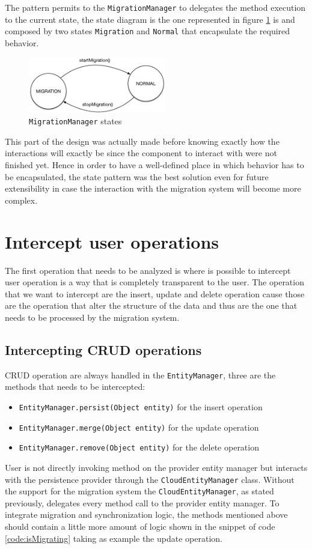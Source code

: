 \noindent The pattern permits to the \texttt{MigrationManager} to delegates the method execution to the current state, the state diagram is the one represented in figure \ref{fig:migration-fsa} is and composed by two states \texttt{Migration} and \texttt{Normal} that encapsulate the required behavior.
    
\begin{figure}[tbh]
  \centering
  \includegraphics[width=6cm]{images/migration_fsa}
  \caption{\texttt{MigrationManager} states}
  \label{fig:migration-fsa}
\end{figure} 

\noindent This part of the design was actually made before knowing exactly how the interactions will exactly be since the component to interact with were not finished yet. Hence in order to have a well-defined place in which behavior has to be encapsulated, the state pattern was the best solution even for future extensibility in case the interaction with the migration system will become more complex.  

\section{Intercept user operations}
The first operation that needs to be analyzed is where is possible to intercept user operation is a way that is completely transparent to the user.
The operation that we want to intercept are the insert, update and delete operation cause those are the operation that alter the structure of the data and thus are the one that needs to be processed by the migration system.

\subsection{Intercepting CRUD operations}
CRUD operation are always handled in the \texttt{EntityManager}, three are the methods that needs to be intercepted:
\begin{itemize}
\item \texttt{EntityManager.persist(Object entity)} for the insert operation
\item \texttt{EntityManager.merge(Object entity)} for the update operation
\item \texttt{EntityManager.remove(Object entity)} for the delete operation
\end{itemize}
\noindent User is not directly invoking method on the provider entity manager but interacts with the persistence provider through the \texttt{CloudEntityManager} class. Without the support for the migration system the \texttt{CloudEntityManager}, as stated previously, delegates every method call to the provider entity manager.
To integrate migration and synchronization logic, the methods mentioned above should contain a little more amount of logic shown in the snippet of code \ref{code:isMigrating} taking as example the update operation.

